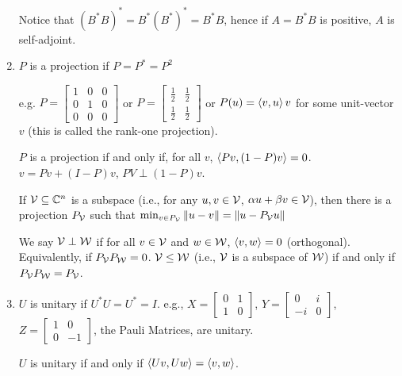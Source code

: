 \begin{enumerate}[label=\arabic*.]
          Notice that $(B^*B)^* = B^*(B^*)^* = B^*B$, hence if $A = B^*B$ is positive,
          $A$ is self-adjoint.
    \item $P$ is a projection if $P = P^* = P^2$

          e.g. $P = \begin{bmatrix}1&0&0\\0&1&0\\0&0&0\end{bmatrix}$ or
          $P = \begin{bmatrix}\frac{1}{2} & \frac{1}{2}\\\frac{1}{2}&\frac{1}{2}\end{bmatrix}$
          or $P(u) = \left\langle v, u\right\rangle v$ for some unit-vector $v$ (this is called
          the rank-one projection).

          $P$ is a projection if and only if, for all $v$, $\left\langle Pv, (1-P)v\right\rangle = 0$.
          $v = Pv + (I - P)v$, $PV \perp (1 - P)v$.

          If $\mathcal{V} \subseteq \mathbb{C}^n$ is a subspace (i.e., for any $u, v\in\mathcal{V}$, $\alpha u + \beta v\in \mathcal{V}$), then there is a
          projection $P_{\mathcal{V}}$ such that $\min_{v\in P_{\mathcal{V}}}\left\lVert u - v\right\rVert = \left\lVert u - P_{\mathcal{V}}u\right\rVert$

          We say $\mathcal{V} \perp \mathcal{W}$ if for all $v \in \mathcal{V}$
          and $w\in \mathcal{W}$, $\left\langle v, w\right\rangle= 0$ (orthogonal). Equivalently,
          if $P_{\mathcal{V}}P_{\mathcal{W}} = 0$. $\mathcal{V} \leq \mathcal{W}$
          (i.e., $\mathcal{V}$ is a subspace of $\mathcal{W}$) if and only if
          $P_{\mathcal{V}}P_{\mathcal{W}} = P_{\mathcal{V}}$.

    \item $U$ is unitary if $U^*U = U^* = I$.
	e.g., $X = \begin{bmatrix}0&1\\1&0\end{bmatrix}$, $Y = \begin{bmatrix}0&i\\-i&0\end{bmatrix}$, $Z = \begin{bmatrix}1&0\\0&-1\end{bmatrix}$, the Pauli Matrices,
	are unitary.

	$U$ is unitary if and only if $\left\langle Uv, Uw\right\rangle = \left\langle v, w\right\rangle$. 
\end{enumerate}